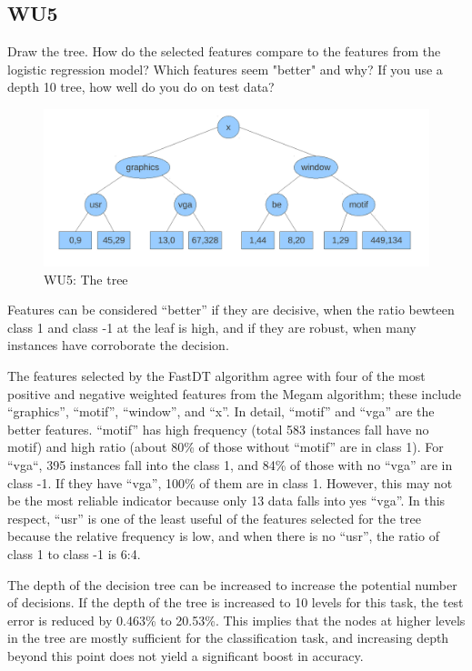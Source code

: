 \documentclass[a4paper,11pt]{article}
\begin{document}
\subsection{WU5}
\textsf{Draw the tree. How do the selected features compare to the
  features from the logistic regression model? Which features seem
  "better" and why? If you use a depth 10 tree, how well do you do on
  test data?}\\

\begin{figure}[!ht]
  \caption{WU5: The tree}
  \centering
  \includegraphics[width=4.75in]{wu5_tree.pdf}
\end{figure}

Features can be considered ``better'' if they are decisive, 
when the ratio bewteen class 1 and class -1 at the leaf is high, 
and if they are robust, when many instances have corroborate the decision.

The features selected by the FastDT algorithm agree with four of the most
positive and negative weighted features from the Megam algorithm; these 
include ``graphics'', ``motif'', ``window'', and ``x''. In detail, 
``motif'' and ``vga'' are the better features. ``motif'' has high frequency
(total 583 instances fall have no motif) and high ratio (about 80\% of
those without ``motif'' are in class 1). For ``vga``,  395 instances fall into
the class 1, and 84\% of those with no ``vga'' are in class -1. If they
have ``vga'', 100\% of them are in class 1. However, this may not be the
most reliable indicator because only 13 data falls into yes ``vga''.
In this respect, ``usr'' is one of the least useful of the features selected
for the tree because the relative frequency is low, and when there is no ``usr'',
the ratio of class 1 to class -1 is 6:4.

The depth of the decision tree can be increased to increase the potential number
of decisions. If the depth of the tree is increased to 10 levels for this task,
the test error is reduced by 0.463\% to 20.53\%. This implies that the nodes at higher
levels in the tree are mostly sufficient for the classification task, and increasing
depth beyond this point does not yield a significant boost in accuracy.
\end{document}
